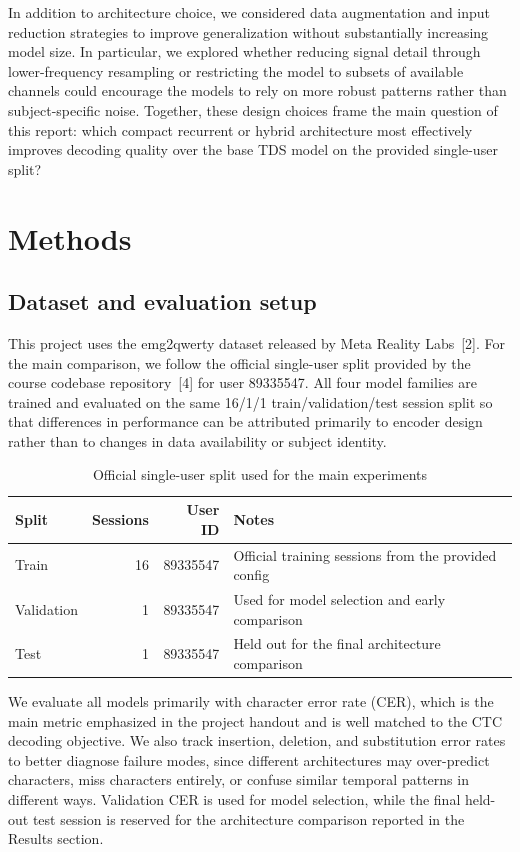 \documentclass{article}
\begin{document}
In addition to architecture choice, we considered data augmentation and input
reduction strategies to improve generalization without substantially increasing
model size. In particular, we explored whether reducing signal detail through
lower-frequency resampling or restricting the model to subsets of available
channels could encourage the models to rely on more robust patterns rather than
subject-specific noise. Together, these design choices frame the main question
of this report: which compact recurrent or hybrid architecture most effectively
improves decoding quality over the base TDS model on the provided single-user
split?

\section{Methods}

\subsection{Dataset and evaluation setup}

This project uses the emg2qwerty dataset released by Meta Reality Labs~[2]. For
the main comparison, we follow the official single-user split provided by the
course codebase repository~[4] for user 89335547. All four model families are trained and
evaluated on the same 16/1/1 train/validation/test session split so that
differences in performance can be attributed primarily to encoder design rather
than to changes in data availability or subject identity.

\begin{table}[t]
	\caption{Official single-user split used for the main experiments}
	\label{tab:official-split}
	\centering
	\begin{tabular}{lrrl}
		\toprule
		Split      & Sessions & User ID  & Notes                                               \\
		\midrule
		Train      & 16       & 89335547 & Official training sessions from the provided config \\
		Validation & 1        & 89335547 & Used for model selection and early comparison       \\
		Test       & 1        & 89335547 & Held out for the final architecture comparison      \\
		\bottomrule
	\end{tabular}
\end{table}

We evaluate all models primarily with character error rate (CER), which is the
main metric emphasized in the project handout and is well matched to the CTC
decoding objective. We also track insertion, deletion, and substitution error
rates to better diagnose failure modes, since different architectures may
over-predict characters, miss characters entirely, or confuse similar temporal
patterns in different ways. Validation CER is used for model selection, while
the final held-out test session is reserved for the architecture comparison
reported in the Results section.
\end{document}
